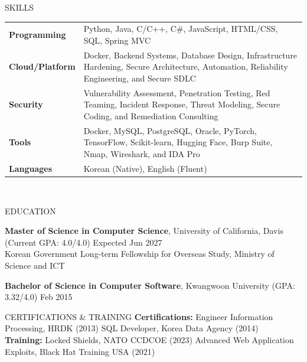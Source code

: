 \documentclass{resume}
\begin{document}
\begin{rSection}{SKILLS}
\begin{tabular}{ @{} >{\bfseries}l @{\hspace{2ex}} p{} }
Programming & Python, Java, C/C++, C\#, JavaScript, HTML/CSS, SQL, Spring MVC \\
Cloud/Platform & Docker, Backend Systems, Database Design, Infrastructure Hardening, Secure Architecture, Automation, Reliability Engineering, and Secure SDLC \\
Security & Vulnerability Assessment, Penetration Testing, Red Teaming, Incident Response, Threat Modeling, Secure Coding, and Remediation Consulting \\
Tools & Docker, MySQL, PostgreSQL, Oracle, PyTorch, TensorFlow, Scikit-learn, Hugging Face, Burp Suite, Nmap, Wireshark, and IDA Pro \\
Languages & Korean (Native), English (Fluent) \\
\end{tabular}\\
\end{rSection}

\begin{rSection}{EDUCATION}

{\bf Master of Science in Computer Science}, University of California, Davis (Current GPA: 4.0/4.0) \hfill {Expected Jun 2027}\\
Korean Government Long-term Fellowship for Overseas Study, Ministry of Science and ICT

{\bf Bachelor of Science in Computer Software}, Kwangwoon University (GPA: 3.32/4.0) \hfill {Feb 2015}

\end{rSection}

\begin{rSection}{CERTIFICATIONS \& TRAINING}
\textbf{Certifications:} Engineer Information Processing, HRDK (2013) \quad SQL Developer, Korea Data Agency (2014) \\
\textbf{Training:} Locked Shields, NATO CCDCOE (2023) \quad Advanced Web Application Exploits, Black Hat Training USA (2021)
\end{rSection}
\end{document}
